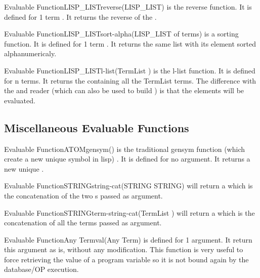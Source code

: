 \begin{typeefa}{Evaluable Function}{LISP\_LIST}{reverse}{(LISP\_LIST)}
is the reverse function. It is defined for 1 term . It returns the
reverse of the .
\end{typeefa}

\begin{typeefa}{Evaluable Function}{LISP\_LIST}{sort-alpha}{(LISP\_LIST of terms)}
is a sorting function. It is defined for 1 term . It returns the
same list with its element sorted alphanumericaly.
\end{typeefa}

\begin{typeefa}{Evaluable Function}{LISP\_LIST}{l-list}{(TermList )}
is the l-list function. It is defined for n terms. It returns the
 containing all the TermList terms. The difference with the
 and  reader (which can also be used to build )
is that the elements will be evaluated.
\end{typeefa}

\subsection{Miscellaneous Evaluable Functions}

\begin{typeefa}{Evaluable Function}{ATOM}{gensym}{()}
is the traditional gensym function (which create a new unique symbol in lisp) .
It is defined for no argument. It returns a new unique .
\end{typeefa}

\begin{typeefa}{Evaluable Function}{STRING}{string-cat}{(STRING STRING)} 
will return a  which is the concatenation of the two
s passed as argument.
\end{typeefa}

\begin{typeefa}{Evaluable Function}{STRING}{term-string-cat}{(TermList )} 
  will return a  which is the concatenation of all the terms
  passed as argument.
\end{typeefa}

\begin{typeefa}{Evaluable Function}{Any Term}{val}{(Any Term)}
is defined for 1 argument. It return this argument as is, without any
modification. This function is very useful to force retrieving the value of a
program variable so it is not bound again by the database/OP execution.
\end{typeefa}

